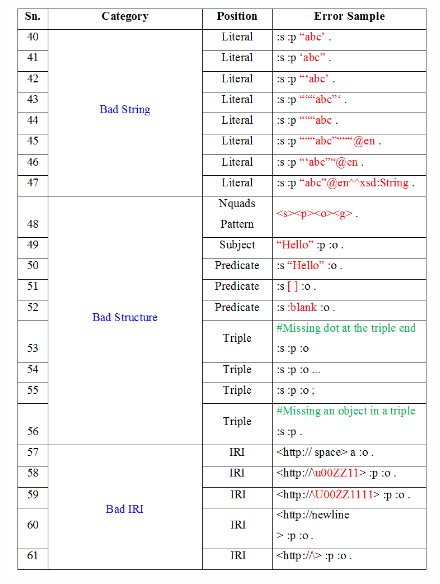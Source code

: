 \begin{appendices}
\begin{figure}[H]
\includegraphics[width=5.5in]{images/bigTablePage7.png}
\end{figure}
%
\end{appendices}
